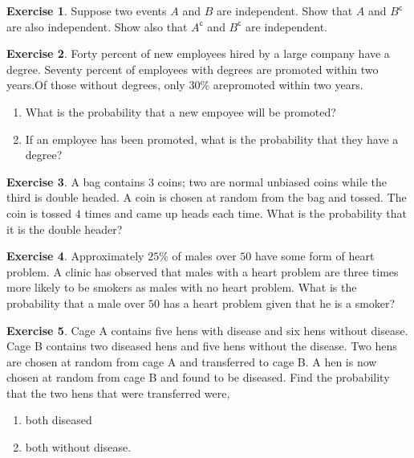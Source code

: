 \documentclass[
]{book}
\theoremstyle{definition}
\theoremstyle{definition}
\theoremstyle{definition}
\newtheorem{exercise}{Exercise}[chapter]
\theoremstyle{definition}
\theoremstyle{remark}
\begin{document}
\begin{exercise}
Suppose two events \(A\) and \(B\) are independent. Show that \(A\) and \(B^{\mathsf{c}}\) are also independent. Show also that \(A^{\mathsf{c}}\) and \(B^{\mathsf{c}}\) are independent.
\end{exercise}

\begin{exercise}

Forty percent of new employees hired by a large company have a degree. Seventy percent of employees with degrees are promoted within two years.Of those without degrees, only \(30\%\) arepromoted within two years.

\begin{enumerate}
\def\labelenumi{\alph{enumi})}
\item
  What is the probability that a new empoyee will be promoted?
\item
  If an employee has been promoted, what is the probability that they have a degree?
\end{enumerate}

\end{exercise}

\begin{exercise}
A bag contains \(3\) coins; two are normal unbiased coins while the third is double headed. A coin is chosen at random from the bag and tossed. The coin is tossed \(4\) times and came up heads each time. What is the probability that it is the double header?
\end{exercise}

\begin{exercise}
Approximately \(25\%\) of males over \(50\) have some form of heart problem. A clinic has observed that males with a heart problem are three times more likely to be smokers as males with no heart problem. What is the probability that a male over \(50\) has a heart problem given that he is a smoker?
\end{exercise}

\begin{exercise}

Cage A contains five hens with disease and six hens without disease. Cage B contains two diseased hens and five hens without the disease. Two hens are chosen at random from cage A and transferred to cage B. A hen is now chosen at random from cage B and found to be diseased. Find the probability that the two hens that were transferred were,

\begin{enumerate}
\def\labelenumi{\alph{enumi})}
\item
  both diseased
\item
  both without disease.
\end{enumerate}

\end{exercise}

  
\end{document}
